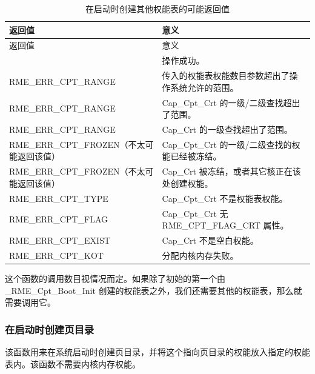 \begin{xltabular}{\textwidth}{@{}>{\hsize\raggedright\arraybackslash}X>{\hsize\raggedright\arraybackslash}X@{}}
\caption{在启动时创建其他权能表的可能返回值}\label{tab:7-44-create-other-capability-tables-at-boot-return-values}\\
\toprule
返回值 & 意义\tabularnewline
\endfirsthead
\toprule
返回值 & 意义\tabularnewline
\midrule
\endhead
\bottomrule
{} & 操作成功。\tabularnewline
    RME\_ERR\_CPT\_RANGE & 传入的权能表权能数目参数超出了操作系统允许的范围。\tabularnewline
    RME\_ERR\_CPT\_RANGE & Cap\_Cpt\_Crt 的一级/二级查找超出了范围。\tabularnewline
    RME\_ERR\_CPT\_RANGE & Cap\_Crt 的一级查找超出了范围。\tabularnewline
    RME\_ERR\_CPT\_FROZEN（不太可能返回该值） & Cap\_Cpt\_Crt 的一级/二级查找的权能已经被冻结。\tabularnewline
    RME\_ERR\_CPT\_FROZEN（不太可能返回该值） & Cap\_Crt 被冻结，或者其它核正在该处创建权能。\tabularnewline
    RME\_ERR\_CPT\_TYPE & Cap\_Cpt\_Crt 不是权能表权能。\tabularnewline
    RME\_ERR\_CPT\_FLAG & Cap\_Cpt\_Crt 无 RME\_CPT\_FLAG\_CRT 属性。\tabularnewline
    RME\_ERR\_CPT\_EXIST & Cap\_Crt 不是空白权能。\tabularnewline
    RME\_ERR\_CPT\_KOT & 分配内核内存失败。\tabularnewline
\end{xltabular}

这个函数的调用数目视情况而定。如果除了初始的第一个由\_RME\_Cpt\_Boot\_Init 创建的权能表之外，我们还需要其他的权能表，那么就需要调用它。

\subsubsection{在启动时创建页目录}\label{subsubsec:7-create-page-directory-at-boot}

该函数用来在系统启动时创建页目录，并将这个指向页目录的权能放入指定的权能表内。该函数不需要内核内存权能。


